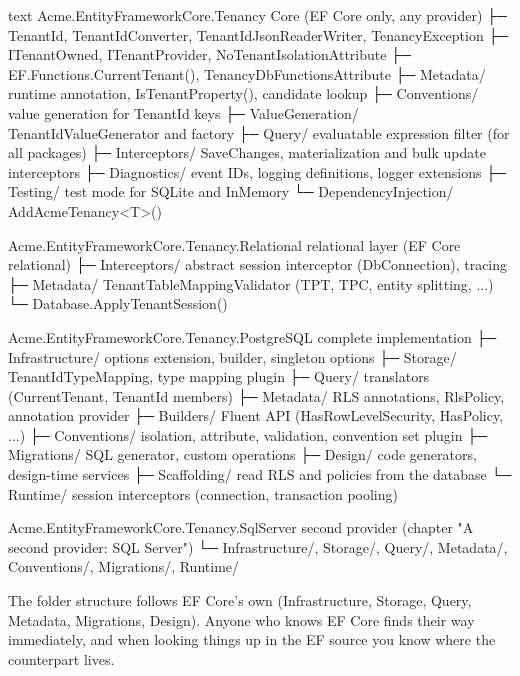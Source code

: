 \begin{sourcecode}{text}
Acme.EntityFrameworkCore.Tenancy               Core (EF Core only, any provider)
├─ TenantId, TenantIdConverter, TenantIdJsonReaderWriter, TenancyException
├─ ITenantOwned, ITenantProvider, NoTenantIsolationAttribute
├─ EF.Functions.CurrentTenant(), TenancyDbFunctionsAttribute
├─ Metadata/         runtime annotation, IsTenantProperty(), candidate lookup
├─ Conventions/      value generation for TenantId keys
├─ ValueGeneration/  TenantIdValueGenerator and factory
├─ Query/            evaluatable expression filter (for all packages)
├─ Interceptors/     SaveChanges, materialization and bulk update interceptors
├─ Diagnostics/      event IDs, logging definitions, logger extensions
├─ Testing/          test mode for SQLite and InMemory
└─ DependencyInjection/  AddAcmeTenancy<T>()

Acme.EntityFrameworkCore.Tenancy.Relational    relational layer (EF Core relational)
├─ Interceptors/     abstract session interceptor (DbConnection), tracing
├─ Metadata/         TenantTableMappingValidator (TPT, TPC, entity splitting, ...)
└─ Database.ApplyTenantSession()

Acme.EntityFrameworkCore.Tenancy.PostgreSQL    complete implementation
├─ Infrastructure/   options extension, builder, singleton options
├─ Storage/          TenantIdTypeMapping, type mapping plugin
├─ Query/            translators (CurrentTenant, TenantId members)
├─ Metadata/         RLS annotations, RlsPolicy, annotation provider
├─ Builders/         Fluent API (HasRowLevelSecurity, HasPolicy, ...)
├─ Conventions/      isolation, attribute, validation, convention set plugin
├─ Migrations/       SQL generator, custom operations
├─ Design/           code generators, design-time services
├─ Scaffolding/      read RLS and policies from the database
└─ Runtime/          session interceptors (connection, transaction pooling)

Acme.EntityFrameworkCore.Tenancy.SqlServer     second provider
                                               (chapter "A second provider: SQL Server")
└─ Infrastructure/, Storage/, Query/, Metadata/, Conventions/, Migrations/, Runtime/
\end{sourcecode}

\begin{tip}
  The folder structure follows EF Core's own (Infrastructure, Storage, Query, Metadata,
  Migrations, Design). Anyone who knows EF Core finds their way immediately, and when
  looking things up in the EF source you know where the counterpart lives.
\end{tip}


